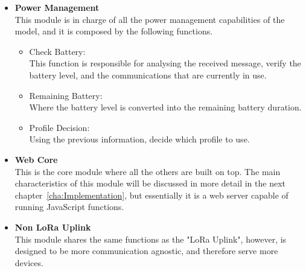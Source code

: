 \begin{itemize}
   \item \textbf{Power Management}\\
   This module is in charge of all the power management capabilities of the model, and it is composed by the following functions. 
   \begin{itemize}
     \item Check Battery: \\This function is responsible for analysing the received message, verify the battery level, and the communications that are currently in use. 
   \end{itemize}
   \begin{itemize}
     \item Remaining Battery: \\Where the battery level is converted into the remaining battery duration.
   \end{itemize}
   \begin{itemize}
     \item Profile Decision: \\Using the previous information, decide which profile to use.
   \end{itemize}
\end{itemize}

\begin{itemize}
\item \textbf{Web Core} \\
This is the core module where all the others are built on top. The main characteristics of this module will be discussed in more detail in the next chapter~\ref{cha:Implementation}, but essentially it is a web server capable of running JavaScript functions.
\end{itemize}

\begin{itemize}
   \item \textbf{Non LoRa Uplink} \\
    This module shares the same functions as the "LoRa Uplink", however, is designed to be more communication agnostic, and therefore serve more devices. 
\end{itemize}


